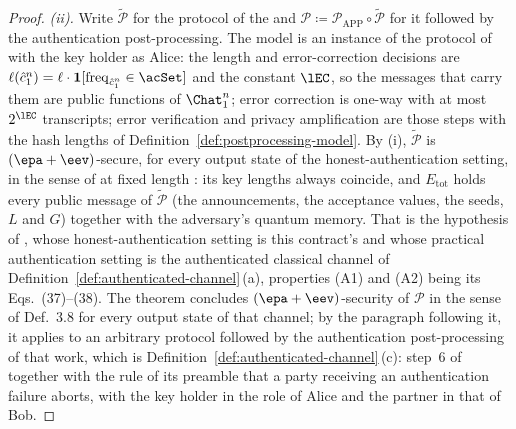 \begin{proof}
\emph{(ii).} Write $\widetilde{\mathcal P}$ for the protocol of the
 and
$\mathcal P\coloneqq\mathcal P_{\mathrm{APP}}\circ\widetilde{\mathcal P}$ for
it followed by the authentication post-processing. The model is an instance
of the protocol of \cite[Sec.~4.1, Protocol~1, steps~2--5]{tupkary2026decoy}
with the key holder as Alice: the length and error-correction decisions are
$\ell(\hat c_1^n)=\ell\cdot\mathbf 1[\operatorname{freq}_{\hat c_1^n}\in
\acSet]$ and the constant $\lEC$, so the messages that carry them are public
functions of $\Chat_1^n$; error correction is one-way with at most
$2^{\lEC}$ transcripts; error verification and privacy amplification are
those steps with the hash lengths of
Definition~\ref{def:postprocessing-model}. By (i),
$\widetilde{\mathcal P}$ is $(\epa+\eev)$-secure, for every output state of
the honest-authentication setting, in the sense of
\cite[Sec.~3.3, Def.~3.9]{tupkary2026decoy} at fixed length
\cite[Eq.~(23)]{tupkary2026decoy}: its key lengths always coincide, and
$E_{\mathrm{tot}}$ holds every public message of $\widetilde{\mathcal P}$
(the announcements, the acceptance values, the seeds, $L$ and $G$) together
with the adversary's quantum memory. That is the hypothesis of
\cite[Sec.~5, Thm.~5.1]{tupkary2026decoy}, whose honest-authentication setting
is this contract's and whose practical authentication setting is the
authenticated classical channel of
Definition~\ref{def:authenticated-channel}\,(a), properties (A1) and (A2)
being its Eqs.~(37)--(38). The theorem concludes $(\epa+\eev)$-security of
$\mathcal P$ in the sense of Def.~3.8 for every output state of that channel;
by the paragraph following it, it applies to an arbitrary protocol followed
by the authentication post-processing of that work, which is
Definition~\ref{def:authenticated-channel}\,(c): step~6 of
\cite[Sec.~4.1, Protocol~1]{tupkary2026decoy} together with the rule of its
preamble that a party receiving an authentication failure aborts, with the
key holder in the role of Alice and the partner in that of Bob.


\end{proof}

